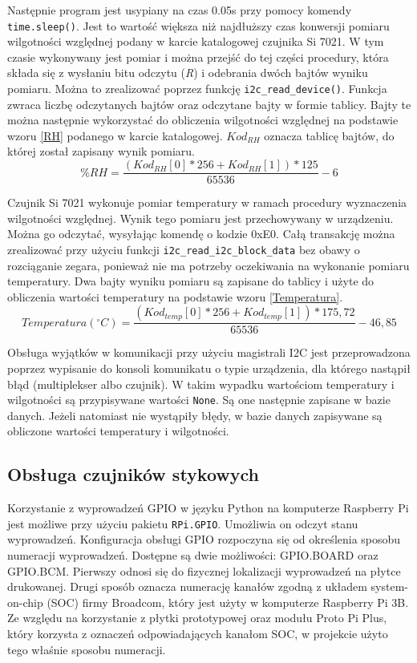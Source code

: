 \documentclass[a4paper,11pt,twoside]{article}
\begin{document}
Następnie program jest usypiany na czas 0.05s przy pomocy komendy \texttt{time.sleep()}. Jest to wartość większa niż najdłuższy czas konwersji pomiaru wilgotności względnej podany w karcie katalogowej czujnika Si 7021.\cite{czujnik_temp} W tym czasie wykonywany jest pomiar i można przejść do tej części procedury, która składa się z wysłaniu bitu odczytu (\textit{R}) i odebrania dwóch bajtów wyniku pomiaru. Można to zrealizować poprzez funkcję \texttt{i2c{\_}read{\_}device()}\cite{i2c_read_device}. Funkcja zwraca liczbę odczytanych bajtów oraz odczytane bajty w formie tablicy. Bajty te można następnie wykorzystać do obliczenia wilgotności względnej na podstawie wzoru \ref{RH} podanego w karcie katalogowej.\cite{czujnik_temp} ${Kod_{RH}}$ oznacza tablicę bajtów, do której został zapisany wynik pomiaru.
\begin{equation} \label{RH}
\%RH = \frac{(Kod_{RH}[0] * 256 + Kod_{RH}[1]) * 125}{65536} - 6  
\end{equation}

Czujnik Si 7021 wykonuje pomiar temperatury w ramach procedury wyznaczenia wilgotności względnej. Wynik tego pomiaru jest przechowywany w urządzeniu. Można go odczytać, wysyłając komendę o kodzie 0xE0. Całą transakcję można zrealizować przy użyciu funkcji \texttt{i2c{\_}read{\_}i2c{\_}block{\_}data} bez obawy o rozciąganie zegara, ponieważ nie ma potrzeby oczekiwania na wykonanie pomiaru temperatury. Dwa bajty wyniku pomiaru są zapisane do tablicy i użyte do obliczenia wartości temperatury na podstawie wzoru \ref{Temperatura}.\cite{czujnik_temp}
\begin{equation} \label{Temperatura}
Temperatura ({^\circ}C) = \frac{(Kod_{temp}[0] * 256 + Kod_{temp}[1]) * 175,72}{65536} - 46,85  
\end{equation}

Obsługa wyjątków w komunikacji przy użyciu magistrali I2C jest przeprowadzona poprzez wypisanie do konsoli komunikatu o typie urządzenia, dla którego nastąpił błąd (multiplekser albo czujnik). W takim wypadku wartościom temperatury i wilgotności są przypisywane wartości \texttt{None}. Są one następnie zapisane w bazie danych. Jeżeli natomiast nie wystąpiły błędy, w bazie danych zapisywane są obliczone wartości temperatury i wilgotności.

\subsection{Obsługa czujników stykowych}
Korzystanie z wyprowadzeń GPIO w języku Python na komputerze Raspberry Pi jest możliwe przy użyciu pakietu \texttt{RPi.GPIO}. Umożliwia on odczyt stanu wyprowadzeń. Konfiguracja obsługi GPIO rozpoczyna się od określenia sposobu numeracji wyprowadzeń. Dostępne są dwie możliwości: GPIO.BOARD oraz GPIO.BCM. Pierwszy odnosi się do fizycznej lokalizacji wyprowadzeń na płytce drukowanej. Drugi sposób oznacza numerację kanałów zgodną z układem system-on-chip (SOC) firmy Broadcom, który jest użyty w komputerze Raspberry Pi 3B. Ze względu na korzystanie z płytki prototypowej oraz modułu Proto Pi Plus, który korzysta z oznaczeń odpowiadających kanałom SOC, w projekcie użyto tego właśnie sposobu numeracji.
\end{document}
